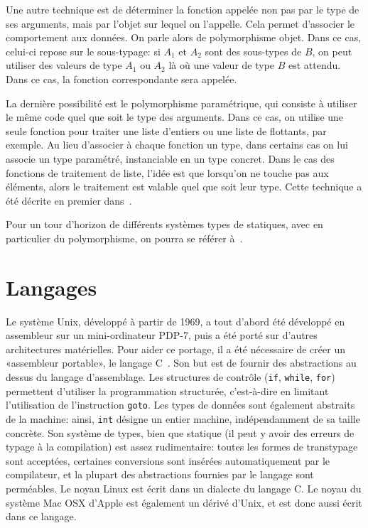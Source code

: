Une autre technique est de déterminer la fonction appelée non pas par le type
de ses arguments, mais par l'objet sur lequel on l'appelle. Cela permet
d'associer le comportement aux données. On parle alors de polymorphisme objet.
Dans ce cas, celui-ci repose sur le sous-typage: si $A_1$ et $A_2$ sont des
sous-types de $B$, on peut utiliser des valeurs de type $A_1$ ou $A_2$ là où une
valeur de type $B$ est attendu. Dans ce cas, la fonction correspondante sera
appelée.

La dernière possibilité est le polymorphisme paramétrique, qui consiste à
utiliser le \linebreak même code quel que soit le type des arguments. Dans ce
cas, on utilise une seule fonction pour traiter une liste d'entiers ou une liste
de flottants, par exemple. Au lieu d'associer à chaque fonction un type, dans
certains cas on lui associe un type paramétré, instanciable en un type concret.
Dans le cas des fonctions de traitement de liste, l'idée est que lorsqu'on ne
touche pas aux éléments, alors le traitement est valable quel que soit leur type.
Cette technique a été décrite en premier dans~\cite{Milner78}.

Pour un tour d'horizon de différents systèmes types de statiques, avec en
particulier du polymorphisme, on pourra se référer à~\cite{TAPL}.

\section{Langages}

Le système Unix, développé à partir de 1969, a tout d'abord été développé en
assembleur sur un mini-ordinateur PDP-7, puis a été porté sur d'autres
architectures matérielles. Pour aider ce portage, il a été nécessaire de créer
un «assembleur portable», le langage C~\cite{KandR,AnsiC}. Son but est de
fournir des abstractions au dessus du langage d'assemblage. Les structures de
contrôle (\texttt{if}, \texttt{while}, \texttt{for}) permettent d'utiliser la
programmation structurée, c'est-à-dire en limitant l'utilisation de
l'instruction \texttt{goto}. Les types de données sont également abstraits de la
machine: ainsi, \texttt{int} désigne un entier machine, indépendamment de sa
taille concrète. Son système de types, bien que statique (il peut y avoir des
erreurs de typage à la compilation) est assez rudimentaire: toutes les formes
de transtypage sont acceptées, certaines conversions sont insérées
automatiquement par le compilateur, et la plupart des abstractions fournies par
le langage sont perméables. Le noyau Linux est écrit dans un dialecte du langage
C. Le noyau du système Mac OSX d'Apple est également un dérivé d'Unix, et est
donc aussi écrit dans ce langage.

